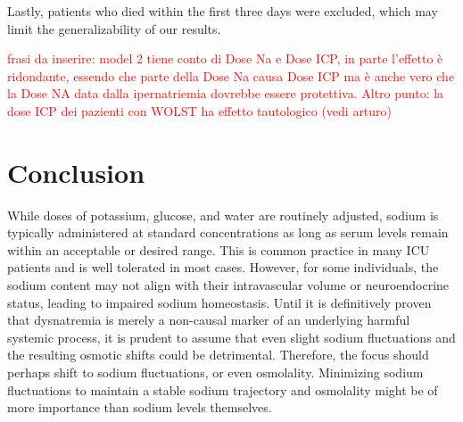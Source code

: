 Lastly, patients who died within the first three days were excluded, which may limit the generalizability of our results.

\textcolor{red}{frasi da inserire: model 2 tiene conto di Dose Na e Dose ICP, in parte l'effetto è ridondante, essendo che parte della Dose Na causa Dose ICP ma è anche vero che la Dose NA data dalla ipernatriemia dovrebbe essere protettiva. Altro punto: la dose ICP dei pazienti con WOLST ha effetto tautologico (vedi arturo)}


\section{Conclusion}
While doses of potassium, glucose, and water are routinely adjusted, sodium is typically administered at standard concentrations as long as serum levels remain within an acceptable or desired range. This is common practice in many ICU patients and is well tolerated in most cases. However, for some individuals, the sodium content may not align with their intravascular volume or neuroendocrine status, leading to impaired sodium homeostasis. Until it is definitively proven that dysnatremia is merely a non-causal marker of an underlying harmful systemic process, it is prudent to assume that even slight sodium fluctuations and the resulting osmotic shifts could be detrimental. Therefore, the focus should perhaps shift to sodium fluctuations, or even osmolality. Minimizing sodium fluctuations to maintain a stable sodium trajectory and osmolality might be of more importance than sodium levels themselves.





